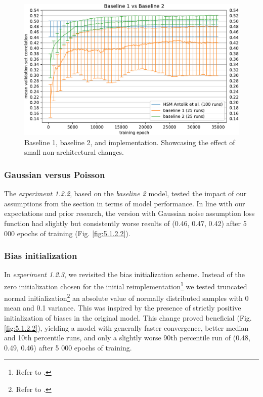 \begin{figure}[H]
    \centering
    \includegraphics[width=1\textwidth]{../figures/05_1_2_1_2}
    \caption[Experiment 1.2.1 2]{Baseline 1, baseline 2, and \citeauthor{antolik} implementation. Showcasing the effect of small non-architectural changes.}
    \label{fig:5.1.2.1_2}
\end{figure}

\subsubsection{Gaussian versus Poisson}\label{ex:1.2.2}
The \emph{experiment 1.2.2}, based on the \emph{baseline 2} model, tested the impact of our assumptions from the  section in terms of model performance. In line with our expectations and prior research, the version with Gaussian noise assumption loss function had slightly but consistently worse results of (0.46, 0.47, 0.42) after 5 000 epochs of training (Fig. \ref{fig:5.1.2.2}). 

\subsubsection{Bias initialization}\label{ex:1.2.3}

In \emph{experiment 1.2.3}, we revisited the bias initialization scheme. Instead of the zero initialization chosen for the initial reimplementation\footnote{Refer to .} we tested truncated normal initialization\footnote{Refer to .} an absolute value of normally distributed samples with 0 mean and 0.1 variance. This was inspired by the presence of strictly positive initialization of biases in the original model. This change proved beneficial (Fig. \ref{fig:5.1.2.2}), yielding a model with generally faster convergence, better median and 10th percentile runs, and only a slightly worse 90th percentile run of (0.48, 0.49, 0.46) after 5 000 epochs of training.

